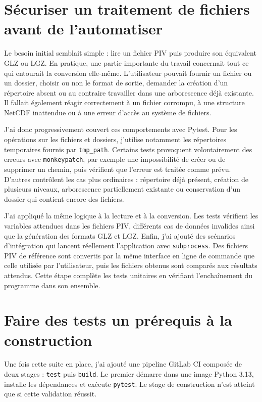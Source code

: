 \section{Sécuriser un traitement de fichiers avant de l'automatiser}

Le besoin initial semblait simple : lire un fichier PIV puis produire son équivalent GLZ ou LGZ. En pratique, une partie importante du travail concernait tout ce qui entourait la conversion elle-même. L'utilisateur pouvait fournir un fichier ou un dossier, choisir ou non le format de sortie, demander la création d'un répertoire absent ou au contraire travailler dans une arborescence déjà existante. Il fallait également réagir correctement à un fichier corrompu, à une structure NetCDF inattendue ou à une erreur d'accès au système de fichiers.

J'ai donc progressivement couvert ces comportements avec Pytest. Pour les opérations sur les fichiers et dossiers, j'utilise notamment les répertoires temporaires fournis par \texttt{tmp\_path}. Certains tests provoquent volontairement des erreurs avec \texttt{monkeypatch}, par exemple une impossibilité de créer ou de supprimer un chemin, puis vérifient que l'erreur est traitée comme prévu. D'autres contrôlent les cas plus ordinaires : répertoire déjà présent, création de plusieurs niveaux, arborescence partiellement existante ou conservation d'un dossier qui contient encore des fichiers.

J'ai appliqué la même logique à la lecture et à la conversion. Les tests vérifient les variables attendues dans les fichiers PIV, différents cas de données invalides ainsi que la génération des formats GLZ et LGZ. Enfin, j'ai ajouté des scénarios d'intégration qui lancent réellement l'application avec \texttt{subprocess}. Des fichiers PIV de référence sont convertis par la même interface en ligne de commande que celle utilisée par l'utilisateur, puis les fichiers obtenus sont comparés aux résultats attendus. Cette étape complète les tests unitaires en vérifiant l'enchaînement du programme dans son ensemble.

\section{Faire des tests un prérequis à la construction}

Une fois cette suite en place, j'ai ajouté une pipeline GitLab CI composée de deux stages : \texttt{test} puis \texttt{build}. Le premier démarre dans une image Python 3.13, installe les dépendances et exécute \texttt{pytest}. Le stage de construction n'est atteint que si cette validation réussit.


